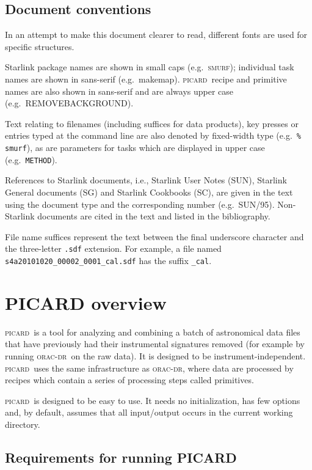 \documentclass[twoside,11pt]{article}
\newcommand{\xref}[3]{#1}
\newcommand{\xlabel}[1]{}
\renewcommand{\_}{\texttt{\symbol{95}}}
\newcommand{\SMURF}{\textsc{smurf}}
\newcommand{\oracdr}{\textsc{orac-dr}}
\newcommand{\picard}{\textsc{picard}}
\newcommand{\task}[1]{\textsf{#1}}
\newcommand{\makemap}{\xref{\task{makemap}}{sun258}{MAKEMAP}}
\newcommand{\aparam}[1]{\texttt{#1}}     %
\begin{document}
\subsection{Document conventions}

In an attempt to make this document clearer to read, different fonts
are used for specific structures.

Starlink package names are shown in small caps (e.g.\ \SMURF);
individual task names are shown in sans-serif
(e.g.\ \makemap). \picard\ recipe and primitive names are also shown
in sans-serif and are always upper case (e.g.\ \task{REMOVE\_BACKGROUND}).

Text relating to filenames (including suffices for data products), key
presses or entries typed at the command line are also denoted by
fixed-width type (e.g.\ \texttt{\% smurf}), as are parameters for
tasks which are displayed in upper case (e.g.\ \aparam{METHOD}).

References to Starlink documents, i.e., Starlink User Notes (SUN),
Starlink General documents (SG) and Starlink Cookbooks (SC), are given
in the text using the document type and the corresponding number
(e.g.\ SUN/95). Non-Starlink documents are cited in the text and
listed in the bibliography.

File name suffices represent the text between the final underscore
character and the three-letter \verb+.sdf+ extension. For example, a
file named \verb+s4a20101020_00002_0001_cal.sdf+ has the suffix
\verb+_cal+.

\section{\xlabel{picard}PICARD overview\label{se:picard}}

\picard\ is a tool for analyzing and combining a batch of astronomical
data files that have previously had their instrumental signatures
removed (for example by running \oracdr\ on the raw data). It is
designed to be instrument-independent. \picard\ uses the same
infrastructure as \oracdr, where data are processed by recipes which
contain a series of processing steps called primitives.

\picard\ is designed to be easy to use. It needs no initialization,
has few options and, by default, assumes that all input/output occurs
in the current working directory.

\subsection{Requirements for running PICARD}
\end{document}
